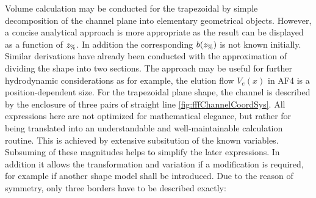 Volume calculation may be conducted for the trapezoidal by simple decomposition of the channel plane into elementary 
geometrical objects. However, a concise analytical approach is more appropriate as the result can be displayed as a 
function of $z_\text{\%}$. In addition the corresponding $b(z_\text{\%})$ is not known initially. Similar derivations have already been 
conducted with the approximation of dividing the shape into two sections.\cite{Wahlund2013, Magnusson2012, 
Bolinsson2018, Haakansson2012}
The approach may be useful for further hydrodynamic considerations as for example, the elution flow $V_e(x)$ in AF4 is 
a position-dependent size. For the trapezoidal plane shape, the channel is described by the enclosure of three pairs of 
straight line \ref{fig:fffChannelCoordSys}. All expressions here are not optimized for mathematical elegance, but 
rather for being translated into an understandable and well-maintainable calculation routine. This is achieved by 
extensive subsitution of the known variables. Subsuming of these magnitudes helps to simplify the later expressions. 
In addition it allows the transformation and variation if a modification is required, for example if another shape 
model shall be introduced.
Due to the reason of symmetry, only three borders have to be described exactly:

